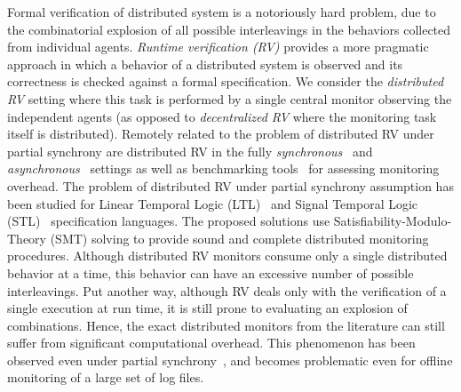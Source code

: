 \documentclass[iicol,lineno]{sn-jnl}
\newcommand{\?}{\text{?}}
\begin{document}
	Formal verification of distributed system is a notoriously hard problem, due to the combinatorial 
	explosion of all possible interleavings in the behaviors collected from individual agents.
	\emph{Runtime verification (RV)} provides a more pragmatic approach in which a behavior of a distributed system is observed and its correctness is checked against a formal specification.
	We consider the \emph{distributed RV} setting where this task is performed by a single central monitor observing the independent agents (as opposed to \emph{decentralized RV} where the monitoring task itself is distributed).
	Remotely related to the problem of distributed RV under partial synchrony are distributed RV in the 
	fully {\em synchronous}~\cite{ef20,cf16,bf16} and {\em 
		asynchronous}~\cite{cgnm13,mg05,og07,mb15,g20,bfrrt22} settings as well as  benchmarking 
	tools~\cite{aafi21} for assessing monitoring overhead.
	The problem of distributed RV under partial synchrony assumption has been studied for Linear 
	Temporal Logic (LTL)~\cite{GangulyMB20} and Signal Temporal Logic (STL)~\cite{MomtazAB23} 
	specification languages.
	The proposed solutions use Satisfiability-Modulo-Theory (SMT) solving to provide sound and 
	complete distributed monitoring procedures.
	Although distributed RV monitors consume only a single distributed behavior at a time, this behavior 
	can have an excessive number of possible interleavings. 
	Put another way, although RV deals only with the verification of a single execution at run time, it is 
	still prone to evaluating an explosion of combinations.
	Hence, the exact distributed monitors from the literature can still suffer from significant 
	computational overhead.
	This phenomenon has been observed even under partial synchrony~\cite{GangulyMB20,gmb24}, and becomes problematic even for offline monitoring of a large set of log files.
	
	
\end{document}
